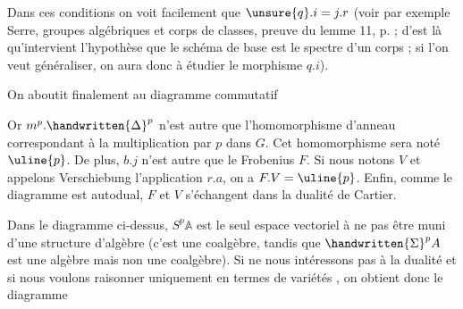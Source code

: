 
Dans ces conditions on voit facilement que $\unsure{q}.i=j.r$ (voir par exemple Serre, groupes algébriques et corps de classes, preuve du lemme 11, p. ; d'est là qu'intervient l'hypothèse que le schéma de base est le spectre d'un corps ; si l'on veut généraliser, on aura donc à étudier le morphisme $q.i$).

On aboutit finalement au diagramme commutatif

Or $m^p.\handwritten{\Delta}^{p}$ n'est autre que l'homomorphisme d'anneau correspondant à la multiplication par $p$ dans $G$. Cet homomorphisme sera noté $\uline{p}$. De plus, $b.j$ n'est autre que le Frobenius $F$. Si nous notons $V$ et appelons Verschiebung l'application $r.a$, on a $F.V=\uline{p}$. Enfin, comme le diagramme est autodual, $F$ et $V$ s'échangent dans la dualité de Cartier.

Dans le diagramme ci-dessus, $S^p\mathbb{A}$ est le seul espace vectoriel à ne pas être muni d'une structure d'algèbre (c'est une coalgèbre, tandis que $\handwritten{\Sigma}^{p}A$ est une algèbre mais non une coalgèbre). Si  ne nous intéressons pas à la dualité et si nous voulons raisonner uniquement en termes de variétés , on obtient donc le diagramme
